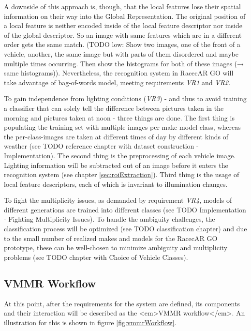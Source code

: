 A downside of this approach is, though, that the local features lose their spatial information on their way into the Global Representation. The original position of a local feature is neither encoded inside of the local feature descriptor nor inside of the global descriptor. So an image with same features which are in a different order gets the same match. (TODO low: Show two images, one of the front of a vehicle, another, the same image but with parts of them disordered and maybe multiple times occurring. Then show the histograms for both of these images (→ same histograms)). Nevertheless, the recognition system in RacecAR GO will take advantage of bag-of-words model, meeting requirements \emph{VR1} and \emph{VR2}.

To gain independence from lighting conditions (\emph{VR3}) - and thus to avoid training a classifier that can solely tell the difference between pictures taken in the morning and pictures taken at noon - three things are done. The first thing is populating the training set with multiple images per make-model class, whereas the per-class-images are taken at different times of day by different kinds of weather (see TODO reference chapter with dataset construction - Implementation). The second thing is the preprocessing of each vehicle image. Lighting information will be subtracted out of an image before it enters the recognition system (see chapter \ref{sec:roiExtraction}). Third thing is the usage of local feature descriptors, each of which is invariant to illumination changes.

To fight the multiplicity issues, as demanded by requirement \emph{VR4}, models of different generations are trained into different classes (see TODO Implementation - Fighting Multiplicity Issues). To handle the ambiguity challenges, the classification process will be optimized (see TODO classification chapter) and due to the small number of realized makes and models for the RacecAR GO prototype, these can be well-chosen to minimize ambiguity and multiplicity problems (see TODO chapter with Choice of Vehicle Classes).

\subsection{VMMR Workflow}
At this point, after the requirements for the system are defined, its components and their interaction will be described as the <em>VMMR workflow</em>. An illustration for this is shown in figure \ref{fig:vmmrWorkflow}.


